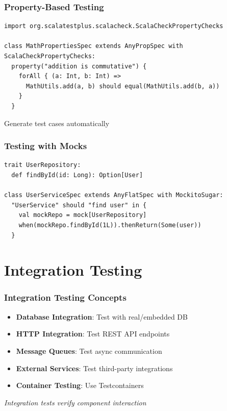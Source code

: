 \documentclass{beamer}
\begin{document}
\begin{frame}[fragile]
\frametitle{Property-Based Testing}

\begin{lstlisting}[style=scalaStyle]
import org.scalatestplus.scalacheck.ScalaCheckPropertyChecks

class MathPropertiesSpec extends AnyPropSpec with ScalaCheckPropertyChecks:
  property("addition is commutative") {
    forAll { (a: Int, b: Int) =>
      MathUtils.add(a, b) should equal(MathUtils.add(b, a))
    }
  }
\end{lstlisting}

Generate test cases automatically

\end{frame}

\begin{frame}[fragile]
\frametitle{Testing with Mocks}

\begin{lstlisting}[style=scalaStyle]
trait UserRepository:
  def findById(id: Long): Option[User]

class UserServiceSpec extends AnyFlatSpec with MockitoSugar:
  "UserService" should "find user" in {
    val mockRepo = mock[UserRepository]
    when(mockRepo.findById(1L)).thenReturn(Some(user))
  }
\end{lstlisting}

\end{frame}

\section{Integration Testing}

\begin{frame}
\frametitle{Integration Testing Concepts}

\begin{itemize}
  \item \textbf{Database Integration}: Test with real/embedded DB
  \item \textbf{HTTP Integration}: Test REST API endpoints
  \item \textbf{Message Queues}: Test async communication
  \item \textbf{External Services}: Test third-party integrations
  \item \textbf{Container Testing}: Use Testcontainers
\end{itemize}

\vspace{0.3cm}
\textit{Integration tests verify component interaction}

\end{frame}
\end{document}
